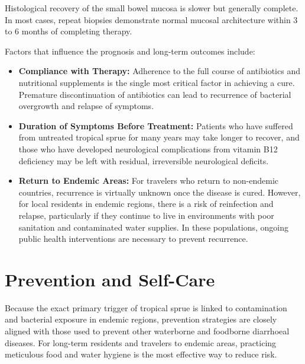 Histological recovery of the small bowel mucosa is slower but generally complete. In most cases, repeat biopsies demonstrate normal mucosal architecture within 3 to 6 months of completing therapy.

Factors that influence the prognosis and long-term outcomes include:
\begin{itemize}
    \item \textbf{Compliance with Therapy:} Adherence to the full course of antibiotics and nutritional supplements is the single most critical factor in achieving a cure. Premature discontinuation of antibiotics can lead to recurrence of bacterial overgrowth and relapse of symptoms.
    \item \textbf{Duration of Symptoms Before Treatment:} Patients who have suffered from untreated tropical sprue for many years may take longer to recover, and those who have developed neurological complications from vitamin B12 deficiency may be left with residual, irreversible neurological deficits.
    \item \textbf{Return to Endemic Areas:} For travelers who return to non-endemic countries, recurrence is virtually unknown once the disease is cured. However, for local residents in endemic regions, there is a risk of reinfection and relapse, particularly if they continue to live in environments with poor sanitation and contaminated water supplies. In these populations, ongoing public health interventions are necessary to prevent recurrence.
\end{itemize}

\section*{Prevention and Self-Care}
Because the exact primary trigger of tropical sprue is linked to contamination and bacterial exposure in endemic regions, prevention strategies are closely aligned with those used to prevent other waterborne and foodborne diarrhoeal diseases. For long-term residents and travelers to endemic areas, practicing meticulous food and water hygiene is the most effective way to reduce risk.

